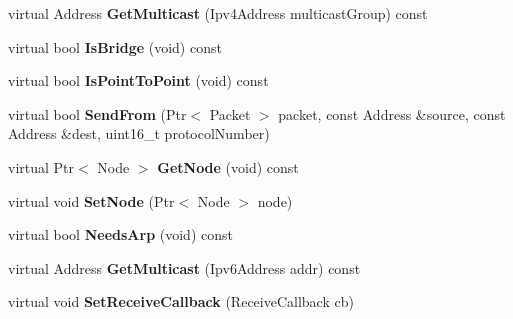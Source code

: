 \begin{DoxyCompactItemize}
virtual Address {\bfseries Get\+Multicast} (Ipv4\+Address multicast\+Group) const
\item 
\mbox{\label{classns3_1_1millicar_1_1MmWaveVehicularNetDevice_ab8498b22d452c090bbb99bd3557e6126}} 
virtual bool {\bfseries Is\+Bridge} (void) const
\item 
\mbox{\label{classns3_1_1millicar_1_1MmWaveVehicularNetDevice_a708cb3cf1d9b318d557b3ed6144918be}} 
virtual bool {\bfseries Is\+Point\+To\+Point} (void) const
\item 
\mbox{\label{classns3_1_1millicar_1_1MmWaveVehicularNetDevice_a37913da22f0cca7f04ef00f05b1176f6}} 
virtual bool {\bfseries Send\+From} (Ptr$<$ Packet $>$ packet, const Address \&source, const Address \&dest, uint16\+\_\+t protocol\+Number)
\item 
\mbox{\label{classns3_1_1millicar_1_1MmWaveVehicularNetDevice_ad1cfc087b6f3972e1b64e016a042569a}} 
virtual Ptr$<$ Node $>$ {\bfseries Get\+Node} (void) const
\item 
\mbox{\label{classns3_1_1millicar_1_1MmWaveVehicularNetDevice_ac07e54a1cc01bf607d3fbe29aec802f0}} 
virtual void {\bfseries Set\+Node} (Ptr$<$ Node $>$ node)
\item 
\mbox{\label{classns3_1_1millicar_1_1MmWaveVehicularNetDevice_abe9fb68d56e55a7a9de77989d4671839}} 
virtual bool {\bfseries Needs\+Arp} (void) const
\item 
\mbox{\label{classns3_1_1millicar_1_1MmWaveVehicularNetDevice_a30ab5096e57d6d42b000abd4733b57ff}} 
virtual Address {\bfseries Get\+Multicast} (Ipv6\+Address addr) const
\item 
\mbox{\label{classns3_1_1millicar_1_1MmWaveVehicularNetDevice_a5207726b256796df9dbb4aae6615d21f}} 
virtual void {\bfseries Set\+Receive\+Callback} (Receive\+Callback cb)
\item 

\end{DoxyCompactItemize}
